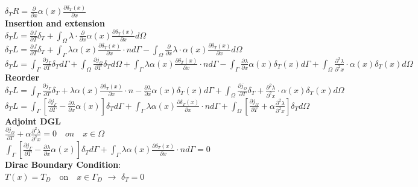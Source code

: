 \documentclass[10pt]{article} %
\begin{document}
\begin{center}
	$\delta_T R = \frac{\partial}{\partial x}\alpha(x) \frac{\partial \delta_T(x)}{\partial x}$\\
	\textbf{Insertion and extension}\\
	$\delta_T L = \frac{\partial J}{\partial T} \delta_T + \int_\Omega \lambda \cdot \frac{\partial}{\partial x}\alpha(x) \frac{\partial \delta_T(x)}{\partial x} d\Omega$\\
	$\delta_T L = \frac{\partial J}{\partial T}\delta_T + \int_\Gamma \lambda \alpha(x) \frac{\partial \delta_T(x)}{\partial x} \cdot n d\Gamma - \int_\Omega \frac{\partial}{\partial x}\lambda \cdot \alpha(x) \frac{\partial \delta_T(x)}{\partial x} d\Omega$\\
	$\delta_T L = \int_\Gamma \frac{\partial j_\Gamma}{\partial T}\delta_T d\Gamma + \int_\Omega \frac{\partial j_\Omega}{\partial T}\delta_T d\Omega + \int_\Gamma \lambda \alpha(x) \frac{\partial \delta_T(x)}{\partial x} \cdot n d\Gamma - \int_\Gamma \frac{\partial \lambda}{\partial x} \alpha(x) \delta_T(x) d\Gamma + \int_\Omega \frac{\partial^2 \lambda}{\partial^2 x} \cdot \alpha(x) \delta_T(x) d\Omega$\\
	\textbf{Reorder}\\
	$\delta_T L = \int_\Gamma \frac{\partial j_\Gamma}{\partial T}\delta_T + \lambda \alpha(x) \frac{\partial \delta_T(x)}{\partial x} \cdot n  - \frac{\partial \lambda}{\partial x} \alpha(x) \delta_T(x)d\Gamma + \int_\Omega \frac{\partial j_\Omega}{\partial T}\delta_T + \frac{\partial^2 \lambda}{\partial^2 x} \cdot \alpha(x) \delta_T(x)d\Omega$\\
	$\delta_T L = \int_\Gamma \left[ \frac{\partial j_\Gamma}{\partial T} - \frac{\partial \lambda}{\partial x} \alpha(x) \right]\delta_T d\Gamma + \int_\Gamma \lambda \alpha(x) \frac{\partial \delta_T(x)}{\partial x} \cdot n d\Gamma + \int_\Omega \left[ \frac{\partial j_\Omega}{\partial T} + \alpha \frac{\partial^2 \lambda}{\partial^2 x} \right]\delta_T d\Omega$\\
	\textbf{Adjoint DGL}\\
	$\frac{\partial j_\Omega}{\partial T} + \alpha \frac{\partial^2 \lambda}{\partial^2 x} = 0 \quad on \quad x \in \Omega$\\
	$\int_\Gamma \left[ \frac{\partial j_\Gamma}{\partial T} - \frac{\partial \lambda}{\partial x} \alpha(x) \right]\delta_T d\Gamma + \int_\Gamma \lambda \alpha(x) \frac{\partial \delta_T(x)}{\partial x} \cdot n d\Gamma = 0$\\
	\textbf{Dirac Boundary Condition}:\\
	$T(x) = T_D \quad \text{on} \quad x\in\Gamma_D$ $\rightarrow$ $\delta_T = 0$\\

\end{center}
\end{document}
